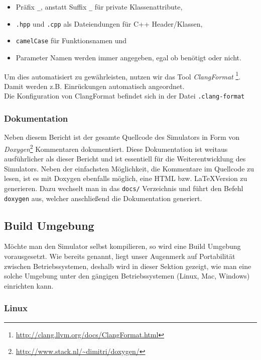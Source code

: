 \begin{itemize}
	\item Präfix \texttt{\_}, anstatt Suffix \texttt{\_} für private Klassenattribute,
	\item \texttt{.hpp} und \texttt{.cpp} als Dateiendungen für C++ Header/Klassen,
	\item \texttt{camelCase} für Funktionsnamen und
	\item Parameter Namen werden immer angegeben, egal ob benötigt oder nicht.
\end{itemize}

Um dies automatisiert zu gewährleisten, nutzen wir das Tool \textit{ClangFormat}
\footnote{\url{http://clang.llvm.org/docs/ClangFormat.html}}. Damit werden
z.B. Einrückungen automatisch angeordnet. \\
Die Konfiguration von ClangFormat befindet sich in der Datei \texttt{.clang-format}

\subsubsection{Dokumentation}

Neben diesem Bericht ist der gesamte Quellcode des Simulators in Form von
\textit{Doxygen}\footnote{\url{http://www.stack.nl/~dimitri/doxygen/}} Kommentaren
dokumentiert. Diese Dokumentation ist weitaus ausführlicher als dieser Bericht und
ist essentiell für die Weiterentwicklung des Simulators. Neben der einfachsten
Möglichkeit, die Kommentare im Quellcode zu lesen, ist es mit Doxygen ebenfalls möglich,
eine HTML bzw. \LaTeX Version zu generieren. Dazu wechselt man in das \texttt{docs/}
Verzeichnis und führt den Befehl \texttt{doxygen} aus, welcher anschließend die
Dokumentation generiert.

\subsection{Build Umgebung}

Möchte man den Simulator selbst kompilieren, so wird eine Build Umgebung vorausgesetzt. 
Wie bereits genannt, liegt unser Augenmerk auf Portabilität zwischen Betriebssystemen,
deshalb wird in dieser Sektion gezeigt, wie man eine solche Umgebung unter den gängigen
Betriebssystemen (Linux, Mac, Windows) einrichten kann.

\subsubsection{Linux}

